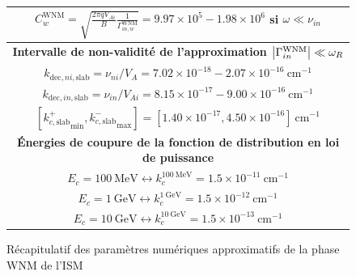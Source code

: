 \documentclass[10pt,a4paper]{article}
\begin{document}
\begin{figure}[h]
\begin{tabular}{|c|}
$C^\mathrm{WNM}_w = \sqrt{\frac{2\pi qV_{Ai}}{B} \frac{1}{\Gamma^\mathrm{WNM}_{in,w}}} = 9.97\times 10^5 - 1.98 \times 10^6$ si $\omega \ll \nu_{in}$ \\ 
\hline 
\hline
\bf{Intervalle de non-validité de l'approximation $\abs{\Gamma^\mathrm{WNM}_{in}} \ll \omega_R$} \\ 
\hline
$k_{\mathrm{dec},ni,\mathrm{slab}} = \nu_{ni}/V_A = 7.02\times 10^{-18} - 2.07 \times 10^{-16} ~ \mathrm{cm}^{-1}$ \\ 
$k_{\mathrm{dec},in,\mathrm{slab}} = \nu_{in}/V_{Ai} = 8.15\times 10^{-17} - 9.00 \times 10^{-16} ~ \mathrm{cm}^{-1}$ \\ 
$\left[{k^+_{c,\mathrm{slab}}}_\mathrm{min}, {k^-_{c,\mathrm{slab}}}_\mathrm{max} \right] = [1.40 \times 10^{-17}, 4.50\times 10^{-16}] ~ \mathrm{cm}^{-1}$ \\ 
\hline
\hline
\bf{Énergies de coupure de la fonction de distribution en loi de puissance} \\ 
\hline
$E_c = 100~\mathrm{MeV} \leftrightarrow k^{100~\mathrm{MeV}}_c = 1.5\times 10^{-11}~\mathrm{cm}^{-1}$ \\ 
$E_c = 1~\mathrm{GeV} \leftrightarrow k^{1~\mathrm{GeV}}_c = 1.5\times 10^{-12}~\mathrm{cm}^{-1}$     \\ 
$E_c = 10~\mathrm{GeV} \leftrightarrow k^{10~\mathrm{GeV}}_c = 1.5\times 10^{-13}~\mathrm{cm}^{-1}$   \\ 
\hline

\end{tabular}
\caption{Récapitulatif des paramètres numériques approximatifs de la phase WNM de l'ISM} 
\label{param_WNM}
\end{figure}
\end{document}
